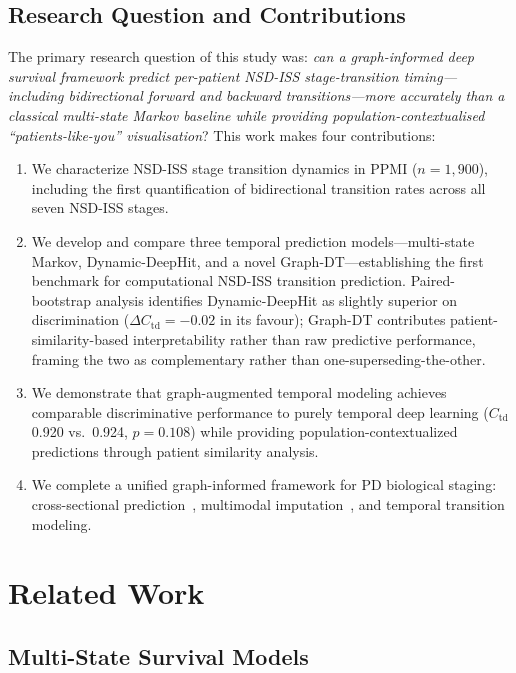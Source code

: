 \subsection{Research Question and Contributions}

The primary research question of this study was: \emph{can a graph-informed deep survival framework predict per-patient NSD-ISS stage-transition timing---including bidirectional forward and backward transitions---more accurately than a classical multi-state Markov baseline while providing population-contextualised ``patients-like-you'' visualisation}? This work makes four contributions:
\begin{enumerate}
    \item We characterize NSD-ISS stage transition dynamics in PPMI ($n{=}1{,}900$), including the first quantification of bidirectional transition rates across all seven NSD-ISS stages.
    \item We develop and compare three temporal prediction models---multi-state Markov, Dynamic-DeepHit, and a novel Graph-DT---establishing the first benchmark for computational NSD-ISS transition prediction. Paired-bootstrap analysis identifies Dynamic-DeepHit as slightly superior on discrimination ($\Delta C_\text{td}{=}-0.02$ in its favour); Graph-DT contributes patient-similarity-based interpretability rather than raw predictive performance, framing the two as complementary rather than one-superseding-the-other.
    \item We demonstrate that graph-augmented temporal modeling achieves comparable discriminative performance to purely temporal deep learning ($C_\text{td}$ 0.920 vs.\ 0.924, $p{=}0.108$) while providing population-contextualized predictions through patient similarity analysis.
    \item We complete a unified graph-informed framework for PD biological staging: cross-sectional prediction~\cite{paper1}, multimodal imputation~\cite{paper2}, and temporal transition modeling.
\end{enumerate}

\section{Related Work}
\label{p3:sec:related}

\subsection{Multi-State Survival Models}

